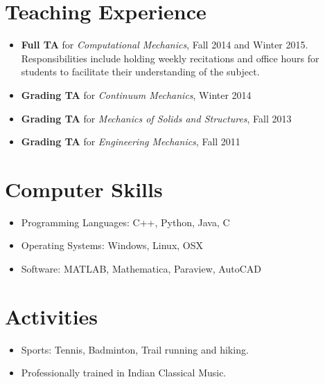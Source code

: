 \documentclass[10pt,fleqn]{article}
\begin{document}
\section*{Teaching Experience}
\begin{itemize}
\item \textbf{Full TA} for \emph{Computational Mechanics}, Fall 2014 and Winter 2015.\\
Responsibilities include holding weekly recitations and office hours for students to facilitate their understanding of the subject.
\item \textbf{Grading TA} for \emph{Continuum Mechanics}, Winter 2014
\item \textbf{Grading TA} for \emph{Mechanics of Solids and Structures}, Fall 2013
\item \textbf{Grading TA} for \emph{Engineering Mechanics}, Fall 2011
\end{itemize}
\section*{Computer Skills}
\begin{itemize}
\setlength{\itemsep}{0pt}
\item Programming Languages: C++, Python, Java, C
\item Operating Systems: Windows, Linux, OSX
\item Software: MATLAB, Mathematica, Paraview, AutoCAD
\end{itemize}

\section*{Activities}
\begin{itemize}
\setlength{\itemsep}{0pt}
\item Sports: Tennis, Badminton, Trail running and hiking.
\item Professionally trained in Indian Classical Music.
\end{itemize}
\end{document}
